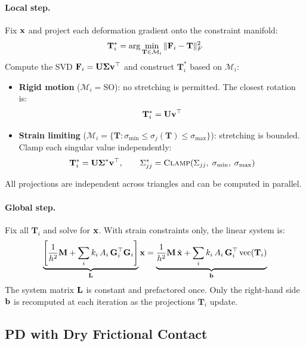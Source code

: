 \paragraph{Local step.} Fix $\mathbf{x}$ and project each deformation gradient onto the constraint manifold:
\begin{equation}
    \mathbf{T}_i^* = \arg \min_{\mathbf{T} \in \mathcal{M}_i} \| \mathbf{F}_i - \mathbf{T} \|^2_F
\end{equation}
Compute the SVD $\mathbf{F}_i = \mathbf{U}\boldsymbol{\Sigma}\mathbf{v}^\top$ and construct $\mathbf{T}^*_i$ based on $\mathcal{M}_i$:
\begin{itemize}
    \item \textbf{Rigid motion} ($\mathcal{M}_i = \mathrm{SO}$): no stretching is permitted. The closest rotation is:
    \begin{equation}
        \mathbf{T}^*_i = \mathbf{U}\mathbf{v}^\top
    \end{equation}
    
    \item \textbf{Strain limiting} ($\mathcal{M}_i = \{\mathbf{T} : \sigma_{\min} \leq \sigma_j(\mathbf{T}) \leq \sigma_{\max}\}$): stretching is bounded. Clamp each singular value independently:
    \begin{equation}
        \mathbf{T}^*_i = \mathbf{U}\boldsymbol{\Sigma}^*\mathbf{v}^\top, 
        \qquad
        \Sigma^*_{jj} = \textsc{Clamp}(\Sigma_{jj},\; \sigma_{\min},\; \sigma_{\max})
    \end{equation}
\end{itemize}
All projections are independent across triangles and can be computed in parallel.

\paragraph{Global step.} Fix all $\mathbf{T}_i$ and solve for $\mathbf{x}$. With strain constraints only, the linear system is:
\begin{equation}
   \underbrace{\left[\frac{1}{h^2}\mathbf{M} + \sum_i k_i\,A_i\,\mathbf{G}_i^\top\mathbf{G}_i\right]}_{\mathbf{L}}
   \mathbf{x} =
   \underbrace{\frac{1}{h^2}\mathbf{M}\,\tilde{\mathbf{x}} + \sum_{i} k_i\,A_i\,\mathbf{G}_i^\top\operatorname{vec}(\mathbf{T}_i)}_{\mathbf{b}}
\end{equation}
The system matrix $\mathbf{L}$ is constant and prefactored once. Only the right-hand side $\mathbf{b}$ is recomputed at each iteration as the projections $\mathbf{T}_i$ update.

\subsection{PD with Dry Frictional Contact \cite{ly2020projective}}

